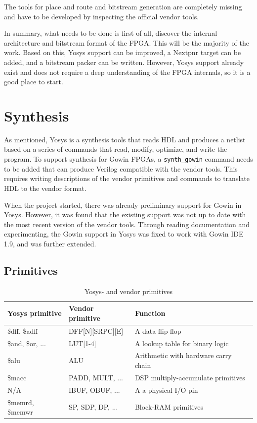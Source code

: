 \documentclass{article}
\begin{document}
The tools for place and route and bitstream generation are completely missing and have to be developed by inspecting the official vendor tools.

In summary, what needs to be done is first of all, discover the internal architecture and bitstream format of the FPGA. This will be the majority of the work. Based on this, Yosys support can be improved, a Nextpnr target can be added, and a bitstream packer can be written. However, Yosys support already exist and does not require a deep understanding of the FPGA internals, so it is a good place to start.

\section{Synthesis}

As mentioned, Yosys is a synthesis tools that reads HDL and produces a netlist based on a series of commands that read, modify, optimize, and write the program. To support synthesis for Gowin FPGAs, a \texttt{synth\_gowin} command needs to be added that can produce Verilog compatible with the vendor tools. This requires writing descriptions of the vendor primitives and commands to translate HDL to the vendor format.

When the project started, there was already preliminary support for Gowin in Yosys. However, it was found that the existing support was not up to date with the most recent version of the vendor tools. Through reading documentation and experimenting, the Gowin support in Yosys was fixed to work with Gowin IDE 1.9, and was further extended.

\subsection{Primitives}

\begin{table}[]
\caption{Yosys- and vendor primitives}
\label{tab:vendor-prims}
\begin{tabular}{|l|l|l|}
\hline
\textbf{Yosys primitive} & \textbf{Vendor primitive}   & \textbf{Function}                                     \\ \hline
\$dff, \$adff              & DFF{[}N{]}{[}SRPC{]}{[}E{]} & A data flip-flop \\ \hline
\$and, \$or, ...           & LUT{[}1-4{]}                & A lookup table for binary logic           \\ \hline
\$alu                    & ALU                         & Arithmetic with hardware carry chain                  \\ \hline
\$macc                   & PADD, MULT, ...             & DSP multiply-accumulate primitives                    \\ \hline
N/A                      & IBUF, OBUF, ...           & A a physical I/O pin     \\ \hline
\$memrd, \$memwr           & SP, SDP, DP, ...            & Block-RAM primitives                                  \\ \hline
\end{tabular}
\end{table}
\end{document}
